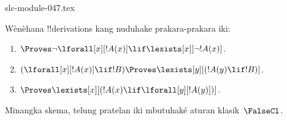 \begin{filecontents*}[overwrite]{slc-module-047.tex}
\begin{prob}
Wènèhana !!{derivation}s kang nuduhake prakara-prakara iki:
\begin{enumerate}
\item $\Proves \lnot\lforall[x][!A(x)] \lif \lexists[x][\lnot!A(x)]$.
\item $(\lforall[x][!A(x)] \lif !B) \Proves \lexists[y][(!A(y) \lif !B)]$.
\item $\Proves \lexists[x][(!A(x) \lif \lforall[y][!A(y)])]$.
\end{enumerate}
Minangka skema, telung pratelan iki mbutuhaké aturan klasik~$\FalseCl$.
\end{prob}


\end{filecontents*}

